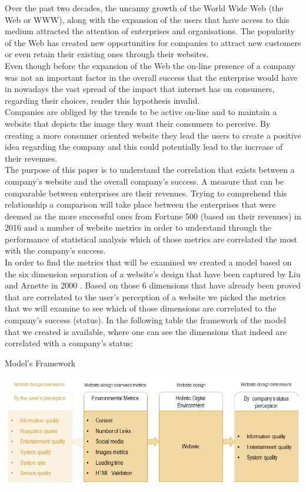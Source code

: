 \documentclass{book}
\begin{document}
Over the past two decades, the uncanny growth of the World Wide Web (the Web or WWW), along with the expansion of the users that have access to this medium attracted the attention of enterprises and organisations. The popularity of the Web has created new opportunities for companies to attract new customers or even retain their existing ones through their websites.\\ 
Even though before the expansion of the Web the on-line presence of a company was not an important factor in the overall success that the enterprise would have in nowadays the vast spread of the impact that internet has on consumers, regarding their choices, render this hypothesis invalid.\\
Companies are obliged by the trends to be active on-line and to maintain a website that depicts the image they want their consumers to perceive. By creating a more consumer oriented website they lead the users to create a positive idea regarding the company and this could potentially lead to the increase of their revenues.\\
The purpose of this paper is to understand the correlation that exists between a company's website and the overall company's success. A measure that can be comparable between enterprises are their revenues. Trying to comprehend this relationship a comparison will take place between the enterprises that were deemed as the more successful ones from Fortune 500 (based on their revenues) in 2016 and a number of website metrics in order to understand through the performance of statistical analysis which of those metrics are correlated the most with the company's success.\\
In order to find the metrics that will be examined we created a model based on the six dimension separation of a website's design that have been captured by Liu and Arnette in 2000 \cite{key9}. Based on those 6 dimensions that have already been proved that are correlated to the user's perception of a website we picked the metrics that we will examine to see which of those dimensions are correlated to the company's success (status). In the following table the framework of the model that we created is available, where one can see the dimensions that indeed are correlated with a company's status:
\begin{table}[H]
\centering
\caption{Model's Framework}
\begin{center}
\includegraphics[scale=0.5]{../R/photos/001_model_framework.png} 
\end{center}
\end{table}
\end{document}
